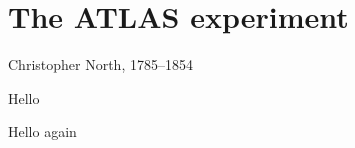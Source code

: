 \chapter{The ATLAS experiment}
\label{chapter:experiment}


%
{Christopher North, 1785--1854}%

Hello


\clearpage

Hello again
